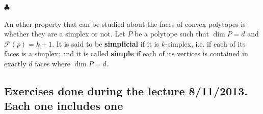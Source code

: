 \begin{flushright}
$\clubsuit$
\end{flushright}

\bigskip

An other property that can be studied about the faces of convex polytopes is whether they are a simplex or not. Let $P$ be a polytope such that $\dim P = d$ and $\mathcal{F}(p) = k+1$. It is said to be \textbf{simplicial} if it is $k$-simplex, i.e. if each of its faces is a simplex; and it is called \textbf{simple} if each of its vertices is contained in exactly $d$ faces where $\dim P =d$.

\bigskip
\subsection{Exercises done during the lecture 8/11/2013. Each one includes one}

